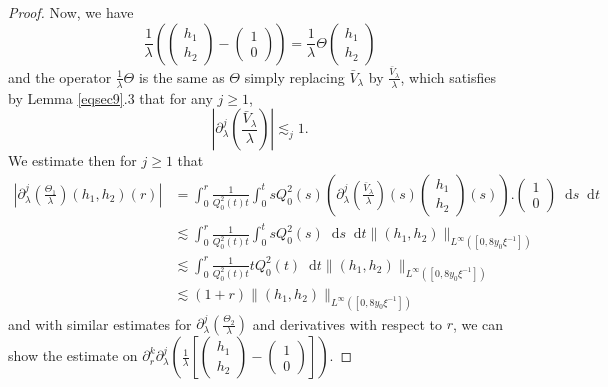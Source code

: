 \documentclass[11 pt]{amsart}
\theoremstyle{definition}
\theoremstyle{remark}
\numberwithin{equation}{section}
\newcommand{\dd}{\mathop{}\!\mathrm{d}}
\begin{document}
\begin{proof}
  Now, we have
  \[  \frac{1}{\lambda}\left( \left(\begin{array}{c}
       h_1\\
       h_2
     \end{array}\right) - \left(\begin{array}{c}
       1\\
       0
     \end{array}\right) \right) = \frac{1}{\lambda } \Theta
     \left(\begin{array}{c}
       h_1\\
       h_2
     \end{array}\right) \]
  and the operator $\frac{1}{\lambda} \Theta $ is the same as $\Theta$ simply
  replacing $\bar{V}_{\lambda}$ by $\frac{\bar{V}_{\lambda}}{\lambda}$, which
  satisfies by Lemma \ref{eqsec9}.3 that for any $j \geqslant 1$,
  \[ \left| \partial^j_{\lambda} \left( \frac{\bar{V}_{\lambda}}{\lambda}
     \right) \right| \lesssim_j 1. \]
  We estimate then for $j \geqslant 1$ that
\begin{align*}
\left| \partial_{\lambda}^j \left( \frac{\Theta_1}{\lambda} \right) (h_1, h_2) (r) \right| & =  \int_0^r \frac{1}{Q_0^2 (t) t} \int_0^t s Q_0^2 (s) \left(
    \partial_{\lambda}^j \left( \frac{\bar{V}_{\lambda}}{\lambda} \right) (s)
    \left(\begin{array}{c}
      h_1\\
      h_2
    \end{array}\right) (s) \right) . \left(\begin{array}{c}
      1\\
      0
    \end{array}\right) \dd s \dd t\\
    & \lesssim  \int_0^r \frac{1}{Q_0^2 (t) t} \int_0^t s Q_0^2 (s) \dd s \dd t
    \| (h_1, h_2) \|_{L^{\infty} ([0, 8 y_0 \xi^{- 1}])}\\
    & \lesssim  \int_0^r \frac{1}{Q_0^2 (t) t} t Q_0^2 (t)\dd t \| (h_1, h_2)
    \|_{L^{\infty} ([0, 8  y_0\xi^{- 1}])}\\
    & \lesssim  (1 + r) \| (h_1, h_2) \|_{L^{\infty} ([0, 8 y_0 \xi^{- 1}])}
  \end{align*}
  and with similar estimates for $\partial_{\lambda}^j \left(
  \frac{\Theta_2}{\lambda} \right)$ and derivatives with respect to $r$, we can show the estimate on $\partial_r^k \partial_{\lambda}^j \left(
  \frac{1}{\lambda} \left[ \left(\begin{array}{c}
    h_1\\
    h_2
  \end{array}\right) - \left(\begin{array}{c}
    1\\
    0
  \end{array}\right) \right]\right) $.
  

\end{proof}
\end{document}

